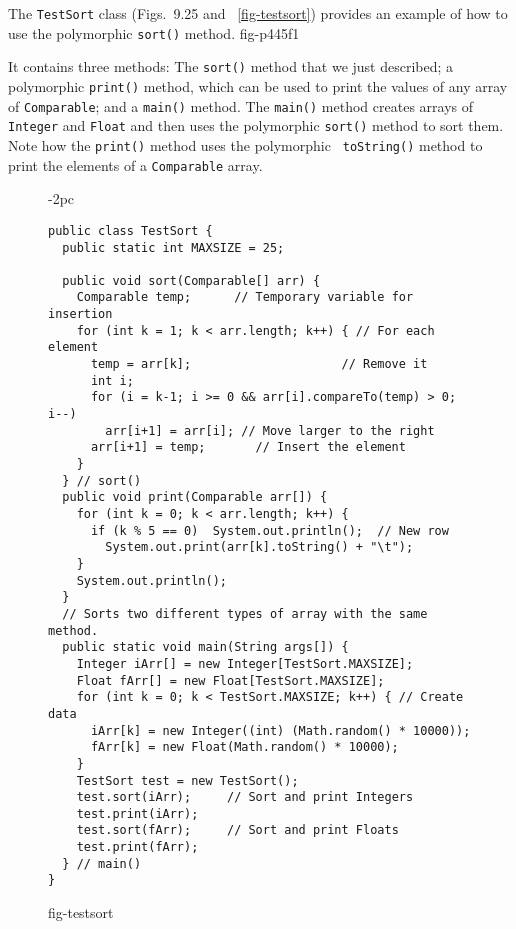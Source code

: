 The {\tt TestSort} class (Figs.~9.25 and ~\ref{fig-testsort}) provides
an example of how to use the polymorphic {\tt sort()} method.
{fig-p445f1}

It contains three methods: The {\tt sort()} method that we just
described; a polymorphic {\tt print()} method, which can be used to
print the values of any array of {\tt Comparable}; and a {\tt main()}
method. The {\tt main()} method creates arrays of {\tt Integer} and
{\tt Float} and then uses the polymorphic {\tt sort()} method to sort
them.  Note how the {\tt print()} method uses the polymorphic {\tt
toString()} method to print the elements of a {\tt Comparable} array.

\begin{figure}[bth]
\jjjprogstart
\begin{jjjlistingleft}[28pc]{-2pc}
\begin{lstlisting}
public class TestSort {
  public static int MAXSIZE = 25;

  public void sort(Comparable[] arr) {
    Comparable temp;      // Temporary variable for insertion
    for (int k = 1; k < arr.length; k++) { // For each element
      temp = arr[k];                     // Remove it 
      int i;
      for (i = k-1; i >= 0 && arr[i].compareTo(temp) > 0; i--) 
        arr[i+1] = arr[i]; // Move larger to the right
      arr[i+1] = temp;       // Insert the element
    }
  } // sort()
  public void print(Comparable arr[]) {
    for (int k = 0; k < arr.length; k++) {
      if (k % 5 == 0)  System.out.println();  // New row  
        System.out.print(arr[k].toString() + "\t"); 
    }
    System.out.println();
  }
  // Sorts two different types of array with the same method.
  public static void main(String args[]) {
    Integer iArr[] = new Integer[TestSort.MAXSIZE]; 
    Float fArr[] = new Float[TestSort.MAXSIZE];   
    for (int k = 0; k < TestSort.MAXSIZE; k++) { // Create data
      iArr[k] = new Integer((int) (Math.random() * 10000));
      fArr[k] = new Float(Math.random() * 10000);
    }
    TestSort test = new TestSort();
    test.sort(iArr);     // Sort and print Integers
    test.print(iArr);
    test.sort(fArr);     // Sort and print Floats
    test.print(fArr);                      
  } // main()
}
\end{lstlisting}
\end{jjjlistingleft}
{fig-testsort}
\end{figure}


